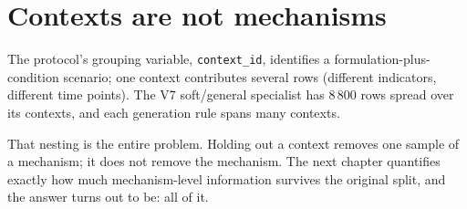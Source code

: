 \section{Contexts are not mechanisms}

The protocol's grouping variable, \texttt{context\_id}, identifies a
formulation-plus-condition scenario; one context contributes several rows
(different indicators, different time points). The V7 soft/general
specialist has $8\,800$ rows spread over its contexts, and each generation
rule spans many contexts.

That nesting is the entire problem. Holding out a context removes one
sample of a mechanism; it does not remove the mechanism. The next chapter
quantifies exactly how much mechanism-level information survives the
original split, and the answer turns out to be: all of it.
